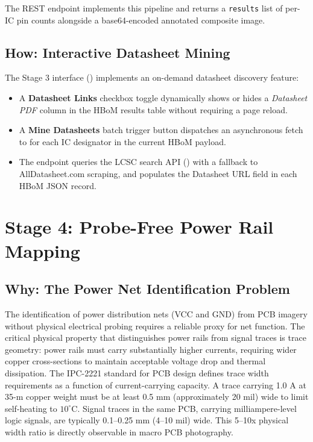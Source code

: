 \documentclass[12pt,a4paper]{report}
\begin{document}
The  REST endpoint implements this pipeline and returns a \texttt{results} list of per-IC pin counts alongside a base64-encoded annotated composite image.

\subsection{How: Interactive Datasheet Mining}
\label{subsec:datasheet_mining}

The Stage 3 interface () implements an on-demand datasheet discovery feature:

\begin{itemize}
  \item A \textbf{Datasheet Links} checkbox toggle dynamically shows or hides a \textit{Datasheet PDF} column in the HBoM results table without requiring a page reload.
  \item A \textbf{Mine Datasheets} batch trigger button dispatches an asynchronous fetch to  for each IC designator in the current HBoM payload.
  \item The endpoint queries the LCSC search API () with a fallback to AllDatasheet.com scraping, and populates the Datasheet URL field in each HBoM JSON record.
\end{itemize}

\section{Stage 4: Probe-Free Power Rail Mapping}
\label{sec:stage4}

\subsection{Why: The Power Net Identification Problem}

The identification of power distribution nets (VCC and GND) from PCB imagery without physical electrical probing requires a reliable proxy for net function. The critical physical property that distinguishes power rails from signal traces is trace geometry: power rails must carry substantially higher currents, requiring wider copper cross-sections to maintain acceptable voltage drop and thermal dissipation. The IPC-2221 standard for PCB design defines trace width requirements as a function of current-carrying capacity. A trace carrying 1.0 A at 35-\textmu m copper weight must be at least 0.5 mm (approximately 20 mil) wide to limit self-heating to $10^{\circ}$C. Signal traces in the same PCB, carrying milliampere-level logic signals, are typically 0.1--0.25 mm (4--10 mil) wide. This 5--10x physical width ratio is directly observable in macro PCB photography.
\end{document}
